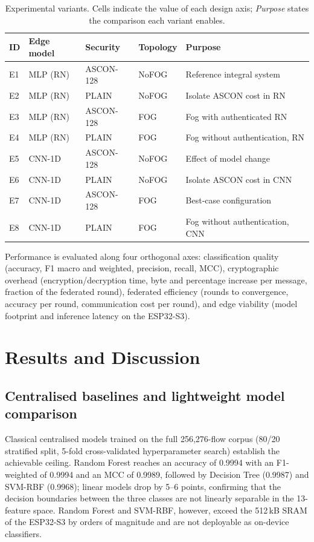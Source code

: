 \documentclass[runningheads]{llncs}
\begin{document}
\begin{table}[t]
\centering
\caption{Experimental variants. Cells indicate the value of each design
axis; \emph{Purpose} states the comparison each variant enables.}
\label{tab:variants}
\small
\begin{tabular}{@{}llllL{4.3cm}@{}}
\toprule
ID & Edge model & Security & Topology & Purpose \\
\midrule
E1 & MLP (RN)  & ASCON-128 & NoFOG & Reference integral system \\
E2 & MLP (RN)  & PLAIN     & NoFOG & Isolate ASCON cost in RN \\
E3 & MLP (RN)  & ASCON-128 & FOG   & Fog with authenticated RN \\
E4 & MLP (RN)  & PLAIN     & FOG   & Fog without authentication, RN \\
E5 & CNN-1D    & ASCON-128 & NoFOG & Effect of model change \\
E6 & CNN-1D    & PLAIN     & NoFOG & Isolate ASCON cost in CNN \\
E7 & CNN-1D    & ASCON-128 & FOG   & Best-case configuration \\
E8 & CNN-1D    & PLAIN     & FOG   & Fog without authentication, CNN \\
\bottomrule
\end{tabular}
\end{table}

Performance is evaluated along four orthogonal axes: classification
quality (accuracy, F1 macro and weighted, precision, recall, MCC),
cryptographic overhead (encryption/decryption time, byte and percentage
increase per message, fraction of the federated round), federated
efficiency (rounds to convergence, accuracy per round, communication cost
per round), and edge viability (model footprint and inference latency on
the ESP32-S3).

\section{Results and Discussion}
\label{sec:results}

\subsection{Centralised baselines and lightweight model comparison}

Classical centralised models trained on the full 256{,}276-flow corpus
(80/20 stratified split, 5-fold cross-validated hyperparameter search)
establish the achievable ceiling. Random Forest reaches an accuracy of
0.9994 with an F1-weighted of 0.9994 and an MCC of 0.9989, followed by
Decision Tree (0.9987) and SVM-RBF (0.9968); linear models drop by 5--6
points, confirming that the decision boundaries between the three classes
are not linearly separable in the 13-feature space. Random Forest and
SVM-RBF, however, exceed the 512\,kB SRAM of the ESP32-S3 by orders of
magnitude and are not deployable as on-device classifiers.
\end{document}
